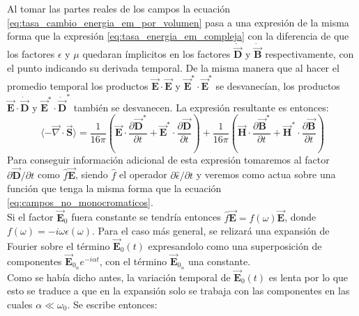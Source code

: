 \documentclass[../tesis_main_file.tex]{subfiles}
\begin{document}
Al tomar las partes reales de los campos la ecuación \ref{eq:tasa_cambio_energia_em_por_volumen} pasa a una expresión de la misma forma que la expresión \ref{eq:tasa_energia_em_compleja} con la diferencia de que los factores $\epsilon$ y $\mu$ quedaran ímplicitos en los factores $\dot{\overrightarrow{\textbf{D}}}$ y $\dot{\overrightarrow{\textbf{B}}}$ respectivamente, con el punto indicando su derivada temporal. De la misma manera que al hacer el promedio temporal los productos $\overrightarrow{\textbf{E}} \cdot \overrightarrow{\textbf{E}}$ y $\overrightarrow{\textbf{E}}^* \cdot \overrightarrow{\textbf{E}}^*$ se desvanecían, los productos $\overrightarrow{\textbf{E}} \cdot \dot{\overrightarrow{\textbf{D}}}$ y $\overrightarrow{\textbf{E}}^* \cdot \dot{\overrightarrow{\textbf{D}}}^*$ también se desvanecen. La expresión resultante es entonces:
\begin{equation}
\label{eq:promedio_temp_div_S_H_y_D}
\langle-\overrightarrow{\nabla} \cdot \overrightarrow{\textbf{S}}\rangle = \frac{1}{16\pi}\left(\overrightarrow{\textbf{E}}\cdot\frac{\partial\overrightarrow{\textbf{D}}^*}{\partial t} + \overrightarrow{\textbf{E}}^* \cdot \frac{\partial \overrightarrow{\textbf{D}}}{\partial t} \right) + \frac{1}{16\pi}\left(\overrightarrow{\textbf{H}}\cdot\frac{\partial\overrightarrow{\textbf{B}}^*}{\partial t} + \overrightarrow{\textbf{H}}^* \cdot \frac{\partial \overrightarrow{\textbf{B}}}{\partial t} \right)
\end{equation}
Para conseguir información adicional de esta expresión tomaremos al factor $\partial \overrightarrow{\textbf{D}}/\partial t$ como $\widehat{f}\overrightarrow{\textbf{E}}$, siendo $\widehat{f}$ el operador $\partial \widehat{\epsilon} / \partial t$ y veremos como actua sobre una función que tenga la misma forma que la ecuación \ref{eq:campos_no_monocromaticos}.\\
Si el factor $\overrightarrow{\textbf{E}}_0$ fuera constante se tendría entonces $\widehat{f}\overrightarrow{\textbf{E}}=f(\omega)\overrightarrow{\textbf{E}}$, donde $f(\omega) = -i\omega\epsilon(\omega)$. Para el caso más general, se relizará una expansión de Fourier sobre el término $\overrightarrow{\textbf{E}}_0(t)$ expresandolo como una superposición de componentes $\overrightarrow{\textbf{E}}_{0_\alpha}e^{-i\alpha t}$, con el término $\overrightarrow{\textbf{E}}_{0_\alpha}$ una constante.\\
Como se había dicho antes, la variación temporal de $\overrightarrow{\textbf{E}}_0(t)$ es lenta por lo que esto se traduce a que en la expansión solo se trabaja con las componentes en las cuales $\alpha \ll  \omega_0$. Se escribe entonces:
\end{document}
